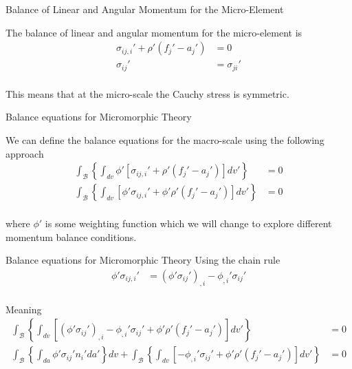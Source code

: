 \documentclass[11pt]{beamer}
\begin{document}
\begin{frame}{Balance of Linear and Angular Momentum for the Micro-Element}

The balance of linear and angular momentum for the micro-element is
\begin{align*}
\sigma_{ij,i}' + \rho'\left(f_{j}'-a_j'\right) &= 0\\
\sigma_{ij}' &= \sigma_{ji}'\\
\end{align*}

This means that at the micro-scale the Cauchy stress is symmetric.

\end{frame}

\begin{frame}{Balance equations for Micromorphic Theory}

We can define the balance equations for the macro-scale using the following approach
\begin{align*}
\int_{\mathcal{B}} \left\{\int_{dv} \phi' \left[\sigma_{ij,i}' + \rho'\left(f_j' - a_j'\right) \right]dv'\right\} &= 0\\
\int_{\mathcal{B}} \left\{\int_{dv} \left[\phi'\sigma_{ij,i}' + \phi'\rho'\left(f_j' - a_j'\right) \right]dv'\right\} &= 0\\
\end{align*}

where $\phi'$ is some weighting function which we will change to explore different momentum balance conditions.

\end{frame}

\begin{frame}{Balance equations for Micromorphic Theory}
Using the chain rule
\begin{align*}
\phi' \sigma_{ij,i}' &= \left(\phi' \sigma_{ij}'\right)_{,i} - \phi_{,i}' \sigma_{ij}'\\
\end{align*}

Meaning
\begin{align*}
\int_{\mathcal{B}} \left\{\int_{dv} \left[ \left(\phi' \sigma_{ij}'\right)_{,i} - \phi_{,i}' \sigma_{ij}' + \phi'\rho'\left(f_j' - a_j'\right) \right]dv'\right\} &= 0\\
\int_{\mathcal{B}} \left\{\int_{da} \phi' \sigma_{ij}' n_i' da'\right\}dv + \int_{\mathcal{B}} \left\{\int_{dv} \left[ - \phi_{,i}' \sigma_{ij}' + \phi'\rho'\left(f_j' - a_j'\right) \right]dv'\right\} &= 0\\
\end{align*}
\end{frame}
\end{document}
